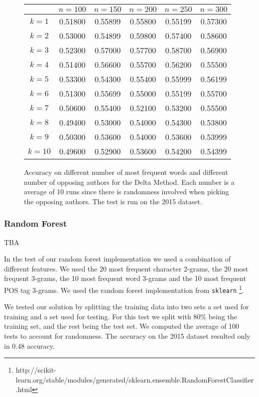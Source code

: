 \begin{figure}
    \centering
    \begin{tabular}{c|ccccc}
               & $n=100$ & $n=150$ & $n=200$ & $n=250$ & $n=300$ \\
        \hline
        $k=1$  & 0.51800 & 0.55899 & 0.55800 & 0.55199 & 0.57300 \\
        $k=2$  & 0.53000 & 0.54899 & 0.59800 & 0.57400 & 0.58600 \\
        $k=3$  & 0.52300 & 0.57000 & 0.57700 & 0.58700 & 0.56900 \\
        $k=4$  & 0.51400 & 0.56600 & 0.55700 & 0.56200 & 0.55500 \\
        $k=5$  & 0.53300 & 0.54300 & 0.55400 & 0.55999 & 0.56199 \\
        $k=6$  & 0.51300 & 0.55699 & 0.55000 & 0.55199 & 0.55700 \\
        $k=7$  & 0.50600 & 0.55400 & 0.52100 & 0.53200 & 0.55500 \\
        $k=8$  & 0.49400 & 0.53000 & 0.54000 & 0.54300 & 0.53800 \\
        $k=9$  & 0.50300 & 0.53600 & 0.54000 & 0.53600 & 0.53999 \\
        $k=10$ & 0.49600 & 0.52900 & 0.53600 & 0.54200 & 0.54399
    \end{tabular}
    \caption{Accuracy on different number of most frequent words and different
        number of opposing authors for the Delta Method. Each number is a
        average of 10 runs since there is randomness involved when picking the
        opposing authors. The test is run on the 2015 dataset.}
    \label{fig:delta_pan_2015_res}
\end{figure}

\subsubsection{Random Forest}
TBA


In the test of our random forest implementation we used a combination
of different features. We used the 20 most frequent character
2-grams, the 20 most frequent 3-grams, the 10 most frequent
word 3-grams and the 10 most frequent \gls{POS} tag 3-grams.
We used the random forest implementation from \texttt{sklearn}
\footnote{http://scikit-learn.org/stable/modules/generated/sklearn.ensemble.RandomForestClassifier.html}.

We tested our solution by splitting the training data into two sets a set used
for training and a set used for testing. For this test we split with 80\% being
the training set, and the rest being the test set. We computed the average of
100 tests to account for randomness. The accuracy on the 2015 dataset resulted
only in 0.48 accuracy.

